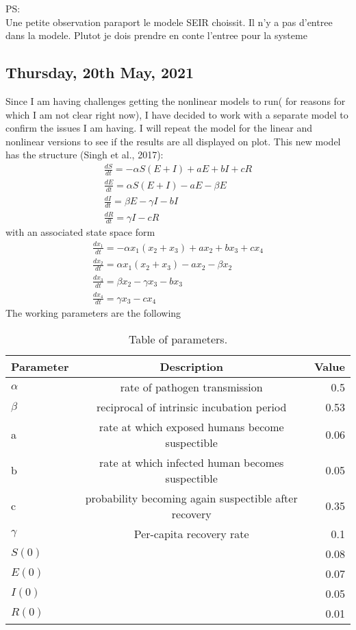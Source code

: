 \documentclass[a4paper, 12pt, notitlepage]{report}
\begin{document}
PS:\\
Une petite observation paraport le modele SEIR choissit. Il n'y a pas d'entree dans la modele. Plutot je dois prendre en conte l'entree pour la systeme

\subsection{Thursday, 20th May, 2021}
Since I am having challenges getting the nonlinear models to run( for reasons for which I am not clear right now), I have decided to work with a separate model to confirm the issues I am having. I will repeat the model for the linear and nonlinear versions to see if the results are all displayed on plot. This new model has the structure (Singh et al., 2017):
\begin{eqnarray}
\label{eqn:seirmdl}
\frac{dS}{dt}=-\alpha S(E+I) + aE + bI + cR\\
\frac{dE}{dt}= \alpha S(E+I) - aE - \beta E\\
\frac{dI}{dt}=\beta E - \gamma I - bI\\
\frac{dR}{dt}=\gamma I - c R
\end{eqnarray}
with an associated state space form
\begin{eqnarray}
\label{eqn:seirmdl}
\frac{dx_1}{dt}=-\alpha x_1(x_2+x_3) + ax_2 + bx_3 + cx_4\\
\frac{dx_2}{dt}= \alpha x_1(x_2+x_3) - ax_2 - \beta x_2\\
\frac{dx_3}{dt}=\beta x_2 - \gamma x_3 - bx_3\\
\frac{dx_4}{dt}=\gamma x_3 - c x_4
\end{eqnarray}
The working parameters are the following
\begin{table}[h!]
  \begin{center}
    \caption{Table of parameters.}
    \label{tab:table1}
    \begin{tabular}{l|c|r} %
      \textbf{Parameter} & \textbf{Description} & \textbf{Value}\\
      \hline
      $\alpha$ &  rate of pathogen transmission & 0.5\\
      $\beta$ & reciprocal of intrinsic incubation period & 0.53\\
       a & rate at which exposed humans become suspectible & 0.06\\
      b & rate at which infected human becomes suspectible & 0.05\\
      c & probability becoming again suspectible after recovery & 0.35\\
      $\gamma$ & Per-capita recovery rate & 0.1\\ 
      $S(0)$ &  & 0.08\\ 
      $E(0)$ &  & 0.07\\
      $I(0)$ &  & 0.05\\
      $R(0)$ &  & 0.01\\
    \end{tabular}
  \end{center}
\end{table}
\end{document}
